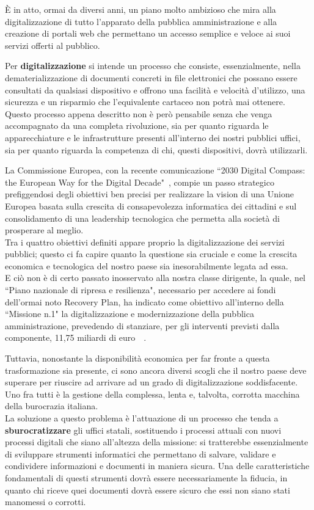 È in atto, ormai da diversi anni, un piano molto ambizioso che mira alla digitalizzazione
di tutto l'apparato della pubblica amministrazione e alla creazione di portali web che
permettano un accesso semplice e veloce ai suoi servizi offerti al pubblico.

Per \textbf{digitalizzazione} si intende un processo che consiste, essenzialmente,
nella dematerializzazione di documenti concreti in file elettronici che possano essere
consultati da qualsiasi dispositivo e offrono una facilità e velocità d'utilizzo,
una sicurezza e un risparmio che l'equivalente cartaceo non potrà mai ottenere.
\\
Questo processo appena descritto non è però pensabile senza che venga accompagnato
da una completa rivoluzione, sia per quanto riguarda le apparecchiature e le
infrastrutture presenti all'interno dei nostri pubblici uffici, sia per quanto
riguarda la competenza di chi, questi dispositivi, dovrà utilizzarli.

La Commissione Europea, con la recente comunicazione
``2030 Digital Compass: the European Way for the Digital Decade"~\cite{intro-1},
compie un passo strategico  prefiggendosi degli obiettivi ben precisi per realizzare
la vision di una Unione Europea basata sulla crescita di consapevolezza informatica
dei cittadini e sul consolidamento di una leadership tecnologica che permetta
alla società di prosperare al meglio.
\\
Tra i quattro obiettivi definiti appare proprio la digitalizzazione dei servizi pubblici;
questo ci fa capire quanto la questione sia cruciale e come la crescita economica
e tecnologica del nostro paese sia inesorabilmente legata ad essa.
\\
E ciò non è di certo passato inosservato alla nostra classe dirigente,
la quale, nel ``Piano nazionale di ripresa e resilienza", necessario per accedere ai fondi
dell'ormai noto Recovery Plan, ha indicato come obiettivo all'interno della ``Missione n.1"
la digitalizzazione e modernizzazione della pubblica amministrazione, prevedendo di stanziare,
per gli interventi previsti dalla componente, 11,75 miliardi di euro~\cite{intro-2}~\cite{intro-3}.

Tuttavia, nonostante la disponibilità economica per far fronte a questa trasformazione
sia presente, ci sono ancora diversi scogli che il nostro paese deve superare per riuscire
ad arrivare ad un grado di digitalizzazione soddisfacente. Uno fra tutti è la gestione
della complessa, lenta e, talvolta, corrotta macchina della burocrazia italiana.
\\
La soluzione a questo problema è l'attuazione di un processo che tenda a \textbf{sburocratizzare}
gli uffici statali, sostituendo i processi attuali con nuovi processi digitali che siano
all'altezza della missione: si tratterebbe essenzialmente di sviluppare strumenti informatici
che permettano di salvare, validare e condividere informazioni e documenti in maniera sicura.
Una delle caratteristiche fondamentali di questi strumenti dovrà essere necessariamente la
fiducia, in quanto chi riceve quei documenti dovrà essere sicuro che essi non siano stati
manomessi o corrotti.

